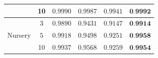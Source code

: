 \documentclass[english]{beamer}
\begin{document}
{\begin{frame}{}
{\begin{table}
\begin{tabular}{|c|c|c|c|c|c|}
					& 10 & $0.9990$ & $0.9987$ & $0.9941 $ & \underline{$\textbf{0.9992}$} \\ \hline
					\multirow{3}{*}{Nursery} & 3 & $0.9890$ & $0.9431$ & $0.9147$ & \underline{$\textbf{0.9914}$} \\
					& $5$ & $0.9918$ & $0.9498$ & $0.9251$ & \underline{$\textbf{0.9958}$} \\
					& 10 & $0.9937$ & $0.9568$ & $0.9259$ & \underline{$\textbf{0.9954}$} \\ \hline
				\end{tabular}
			\end{table}	
		}
	\end{frame} }
\end{document}
